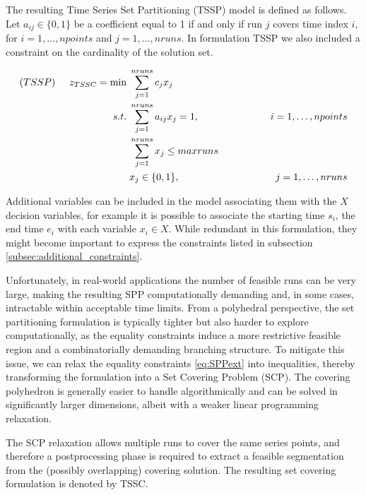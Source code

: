 \documentclass[preprints,article,submit,pdftex,moreauthors]{Definitions/mdpi}
\begin{document}
The resulting Time Series Set Partitioning (TSSP) model is defined as follows. Let $a_{ij} \in \{0,1\}$ be a coefficient equal to 1 if and only if run $j$ covers time index $i$, for $i = 1,\ldots,npoints$ and $j = 1,\ldots,nruns$. In formulation TSSP we also included a constraint on the cardinality of the solution set.

\begin{alignat}{4}
	(TSSP) \hspace{0.5cm} z_{TSSC} = \min &\; \sum_{j=1}^{nruns} c_j x_{j}  \label{eq:SCPobj} \\
	s.t. &\; \sum_{j=1}^{nruns}a_{ij}x_{j} = 1, & \hspace{1.5cm} i=1,\dots,npoints  \label{eq:SCPcov} \\
	&\; \sum_{j=1}^{nruns} x_{j} \leq maxruns \label{eq:SPPext}\\
	&\; x_j \in \{0,1\}, &\; j=1,\dots,nruns  \label{eq:SCPvar}
\end{alignat}

Additional variables can be included in the model associating them with the $X$ decision variables, for example it is possible to associate the starting time $s_i$, the end time $e_i$ with each variable $x_i \in X$. While redundant in this formulation, they might become important to express the constraints listed in subsection \ref{subsec:additional_constraints}.

Unfortunately, in real-world applications the number of feasible runs can be very large, making the resulting SPP computationally demanding and, in some cases, intractable within acceptable time limits. From a polyhedral perspective, the set partitioning formulation is typically tighter but also harder to explore computationally, as the equality constraints induce a more restrictive feasible region and a combinatorially demanding branching structure. To mitigate this issue, we can relax the equality constraints \ref{eq:SPPext} into inequalities, thereby transforming the formulation into a Set Covering Problem (SCP). The covering polyhedron is generally easier to handle algorithmically and can be solved in significantly larger dimensions, albeit with a weaker linear programming relaxation. 

The SCP relaxation allows multiple runs to cover the same series points, and therefore a postprocessing phase is required to extract a feasible segmentation from the (possibly overlapping) covering solution. The resulting set covering formulation is denoted by TSSC.
\end{document}
